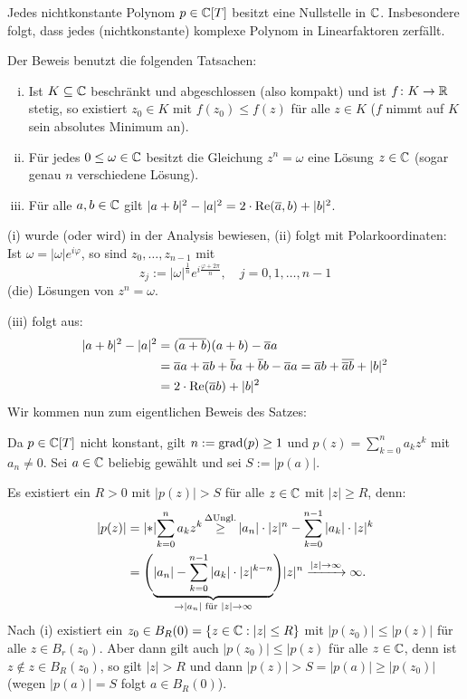 \begin{satz}
	\label{satz:1.11}
	Jedes nichtkonstante Polynom $p \in \mathbb{C}[T]$ besitzt eine Nullstelle in $\mathbb{C}$.
	Insbesondere folgt, dass jedes (nichtkonstante) komplexe Polynom in Linearfaktoren zerfällt. 
\end{satz}

\begin{beweis}
	Der Beweis benutzt die folgenden Tatsachen:
	\begin{enumerate}[(i)]
		\item Ist $K \subseteq \mathbb{C}$ beschränkt und abgeschlossen (also kompakt) und ist $f \colon K \rightarrow \mathbb{R}$ stetig, so existiert $z_0 \in K$ mit $f(z_0) \leq f(z)$ für alle $z \in K$ ($f$ nimmt auf $K$ sein absolutes Minimum an).
		\item Für jedes $0 \leq \omega \in \mathbb{C}$ besitzt die Gleichung $z^n = \omega$ eine Lösung $z \in \mathbb{C}$ (sogar genau $n$ verschiedene Lösung).
		\item Für alle $a,b \in \mathbb{C}$ gilt $|a+b|^2 - |a|^2 = 2 \cdot \operatorname{Re}(\overline{a},b)+|b|^2$.
	\end{enumerate}
	(i) wurde (oder wird) in der Analysis bewiesen, (ii) folgt mit Polarkoordinaten:
	Ist $\omega = |\omega|e^{i\varphi}$, so sind $z_0,\dots,z_{n-1}$ mit
	\[
		z_j := |\omega|^{\frac{1}{n}} e^{i \frac{\varphi+2\pi}{n}}, \quad j=0,1,\dots,n-1
	\]
	(die) Lösungen von $z^n = \omega$.
	
	(iii) folgt aus:
	\begin{align*}
		|a+b|^2 - |a|^2 &= (\overline{a+b})(a+b) - \overline{a}a \\
		&= \overline{a}a + \overline{a}b + \overline{b}a + \overline{b}b - \overline{a}a = \overline{a}b + \overline{\overline{a}b} + |b|^2 \\
		&=2 \cdot \operatorname{Re}(\overline{a}b) + |b|^2
	\end{align*}
	Wir kommen nun zum eigentlichen Beweis des Satzes:
	
	Da $p \in \mathbb{C}[T]$ nicht konstant, gilt $n := \operatorname{grad}(p) \geq 1$ und $p(z) = \sum_{k=0}^{n} a_kz^k$ mit $a_n \neq 0$.
	Sei $a \in \mathbb{C}$ beliebig gewählt und sei $S:= |p(a)|$.
	
	Es existiert ein $R > 0$ mit $|p(z)|> S$ für alle $z \in \mathbb{C}$ mit $|z| \geq R$, denn:
	\begin{align*}
		|p(z)| &= \abs*{\sum_{k=0}^{n} a_k z^{k}} \stack{\Delta\text{Ungl.}}{\geq} |a_n| \cdot |z|^n - \sum_{k=0}^{n-1} |a_k| \cdot |z|^k \\
		&= \Bigg(\Underbrace{|a_n| - \sum_{k=0}^{n-1} |a_k| \cdot |z|^{k-n}}{\rightarrow |a_n| \text{ für } |z| \rightarrow \infty}\Bigg) |z|^n \xrightarrow{|z|\rightarrow \infty} \infty.
	\end{align*}
	Nach (i) existiert ein $z_0 \in B_R(0) = \{z \in \mathbb{C} : |z| \leq R\}$ mit $|p(z_0)| \leq |p(z)|$ für alle $z \in B_r(z_0)$.
	Aber dann gilt auch $|p(z_0)| \leq |p(z)$ für alle $z \in \mathbb{C}$, denn ist $z \notin z \in B_R(z_0)$, so gilt $|z|>R$ und dann $|p(z)| > S = |p(a)| \geq |p(z_0)|$ (wegen $|p(a)| = S$ folgt $a \in B_R(0)$).
	

\end{beweis}
